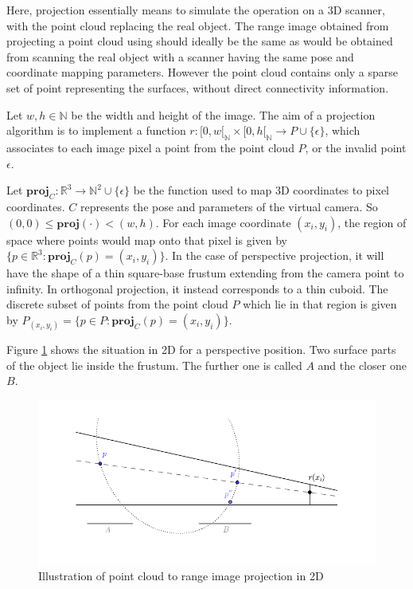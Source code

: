 Here, projection essentially means to simulate the operation on a 3D scanner, with the point cloud replacing the real object. The range image obtained from projecting a point cloud using should ideally be the same as would be obtained from scanning the real object with a scanner having the same pose and coordinate mapping parameters. However the point cloud contains only a sparse set of point representing the surfaces, without direct connectivity information.

Let $w, h \in \mathbb{N}$ be the width and height of the image. The aim of a projection algorithm is to implement a function $r : [0, w[_{\mathbb{N}} \times [0, h[_{\mathbb{N}} \rightarrow P \cup \{ \epsilon \}$, which associates to each image pixel a point from the point cloud $P$, or the invalid point $\epsilon$. 

Let $\mathbf{proj}_{C} : \mathbb{R}^3 \rightarrow \mathbb{N}^2 \cup \{ \epsilon \}$ be the function used to map 3D coordinates to pixel coordinates. $C$ represents the pose and parameters of the virtual camera. So $(0, 0) \leq \mathbf{proj}(\cdot) < (w, h)$. For each image coordinate $(x_i, y_i)$, the region of space where points would map onto that pixel is given by $\{ p \in \mathbb{R}^3 : \mathbf{proj}_{C}(p) = (x_i, y_i) \}$. In the case of perspective projection, it will have the shape of a thin square-base frustum extending from the camera point to infinity. In orthogonal projection, it instead corresponds to a thin cuboid. The discrete subset of points from the point cloud $P$ which lie in that region is given by $P_{(x_i,y_i)} = \{ p \in P : \mathbf{proj}_{C}(p) = (x_i, y_i) \}$.

Figure \ref{fig:pp_projection} shows the situation in 2D for a perspective position. Two surface parts of the object lie inside the frustum. The further one is called $A$ and the closer one $B$.

\begin{figure}[h]
\center
\includegraphics[width=.8\textwidth]{fig/pp_projection.pdf}
\caption{Illustration of point cloud to range image projection in 2D}
\label{fig:pp_projection}
\end{figure}

